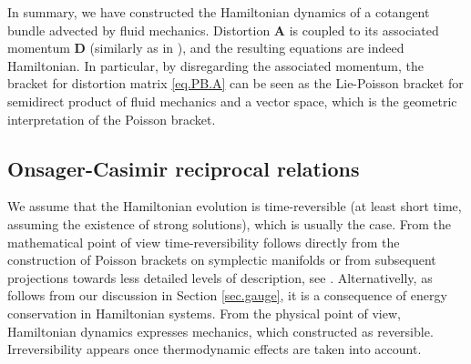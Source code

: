 \documentclass[
10pt, %
a4paper, %
oneside, %
headinclude,footinclude, %
BCOR5mm, %
]{scrartcl}
\renewcommand{\AA}{\mathbf{A}}
\newcommand{\DD}{\mathbf{D}}
\begin{document}
In summary, we have constructed the Hamiltonian dynamics of a cotangent bundle advected by fluid mechanics. Distortion $\AA$ is coupled to its associated momentum $\DD$ (similarly as in \cite{PRD-Torsion2019}), and the resulting equations are indeed Hamiltonian. In particular, by disregarding the associated momentum, the bracket for distortion matrix \eqref{eq.PB.A} can be seen as the Lie-Poisson bracket for semidirect product of fluid mechanics and a vector space, which is the geometric interpretation of the Poisson bracket.

\subsection{Onsager-Casimir reciprocal relations}\label{sec.OCRR}
We assume that the Hamiltonian evolution is time-reversible (at least short time, assuming the existence of strong solutions), which is usually the case. From the mathematical point of view time-reversibility follows directly from the construction of Poisson brackets on symplectic manifolds or from subsequent projections towards less detailed levels of description, see \cite{PRE15}. Alternativelly, as follows from our discussion in Section \ref{sec.gauge}, it is a consequence of energy conservation in Hamiltonian systems. From the physical point of view, Hamiltonian dynamics expresses mechanics, which constructed as reversible. Irreversibility appears once thermodynamic effects are taken into account. 
\end{document}
